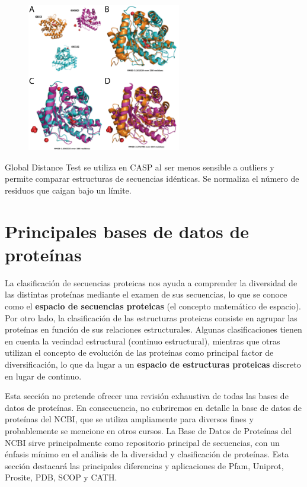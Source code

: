 \begin{figure}[h]
\centering
\includegraphics[width = 0.6\textwidth]{figs/rmsd.png}
\end{figure}

Global Distance Test se utiliza en CASP al ser menos sensible a outliers y permite comparar estructuras de secuencias idénticas. Se normaliza el número de residuos que caigan bajo un límite.

\section{Principales bases de datos de proteínas}
La clasificación de secuencias proteicas nos ayuda a comprender la diversidad de las distintas proteínas mediante el examen de sus secuencias, lo que se conoce como el \textbf{espacio de secuencias proteicas} (el concepto matemático de espacio). Por otro lado, la clasificación de las estructuras proteicas consiste en agrupar las proteínas en función de sus relaciones estructurales. Algunas clasificaciones tienen en cuenta la vecindad estructural (continuo estructural), mientras que otras utilizan el concepto de evolución de las proteínas como principal factor de diversificación, lo que da lugar a un \textbf{espacio de estructuras proteicas} discreto en lugar de continuo.

Esta sección no pretende ofrecer una revisión exhaustiva de todas las bases de datos de proteínas. En consecuencia, no cubriremos en detalle la base de datos de proteínas del NCBI, que se utiliza ampliamente para diversos fines y probablemente se mencione en otros cursos. La Base de Datos de Proteínas del NCBI sirve principalmente como repositorio principal de secuencias, con un énfasis mínimo en el análisis de la diversidad y clasificación de proteínas. Esta sección destacará las principales diferencias y aplicaciones de Pfam, Uniprot, Prosite, PDB, SCOP y CATH. 

